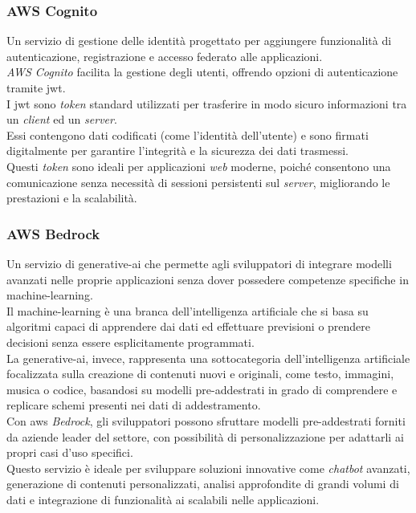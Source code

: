 \subsubsection{AWS Cognito}

Un servizio di gestione delle identità progettato per aggiungere funzionalità di autenticazione, registrazione e accesso federato alle applicazioni.\\
\textit{AWS Cognito} facilita la gestione degli utenti, offrendo opzioni di autenticazione tramite \gls{jwt}.\\

\noindent I \gls{jwt} sono \textit{token} standard utilizzati per trasferire in modo sicuro informazioni tra un \textit{client} ed un \textit{server}.\\
Essi contengono dati codificati (come l'identità dell'utente) e sono firmati digitalmente per garantire l'integrità e la sicurezza dei dati trasmessi.\\
Questi \textit{token} sono ideali per applicazioni \textit{web} moderne, poiché consentono una comunicazione senza necessità di sessioni persistenti sul \textit{server}, migliorando le prestazioni e la scalabilità.\\

\subsubsection{AWS Bedrock}

Un servizio di \gls{generative-ai} che permette agli sviluppatori di integrare modelli avanzati nelle proprie applicazioni senza dover possedere competenze specifiche in \gls{machine-learning}.\\

\noindent Il \gls{machine-learning} è una branca dell’intelligenza artificiale che si basa su algoritmi capaci di apprendere dai dati ed effettuare previsioni o prendere decisioni senza essere esplicitamente programmati.\\ 
La \gls{generative-ai}, invece, rappresenta una sottocategoria dell’intelligenza artificiale focalizzata sulla creazione di contenuti nuovi e originali, come testo, immagini, musica o codice,
basandosi su modelli pre-addestrati in grado di comprendere e replicare schemi presenti nei dati di addestramento.\\

\noindent Con \gls{aws} \textit{Bedrock}, gli sviluppatori possono sfruttare modelli pre-addestrati forniti da aziende leader del settore, con possibilità di personalizzazione per adattarli ai propri casi d’uso specifici.\\
Questo servizio è ideale per sviluppare soluzioni innovative come \textit{chatbot} avanzati, generazione di contenuti personalizzati, analisi approfondite di grandi volumi di dati e integrazione di funzionalità \gls{ai} scalabili nelle applicazioni.\\ 

